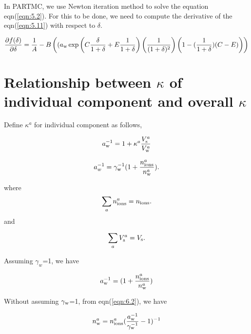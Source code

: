 \documentclass[12pt]{article}
\begin{document}
In PARTMC, we use Newton iteration method to solve the equation eqn(\ref{eqn:5.2}). For this to be done, we need to compute the derivative of the eqn(\ref{eqn:5.11}) with respect to $\delta$.

\begin{equation}\label{eqn:5.12}
\frac{\partial{f( \delta)} } {\partial{\delta}} =
\frac{1}{A} -B \left((a_{\rm w}\exp{\left(C \frac{\delta}{1+\delta} +E \frac{1}{1+\delta}\right)}   
\left(\frac{1}{(1+\delta)^{2}}\right)
\left(1-(\frac{1}{1+\delta})(C-E) \right)
\right)
\end{equation}

\section{Relationship between $\kappa$ of individual component and overall $\kappa$}

Define $\kappa^{a}$ for individual component as follows, 

\begin{equation}\label{eqn:6.1}
a_{\rm w}^{-1}=1+\kappa^{a} \frac{V_{\rm s}^{a}}{V_{\rm w}^{a}} 
\end{equation}

\begin{equation}\label{eqn:6.2}
a_{w}^{-1}=\gamma_{\rm w}^{-1} (1+\frac{n_{\rm ions}^{a}}{n_{\rm w}^{a}}).
\end{equation}

where
\begin{equation}\label{eqn:6.3}
\sum_{a} n_{\rm ions}^{a}=n_{\rm ions}.
\end{equation}
 and 
 
\begin{equation}\label{eqn:6.4}
\sum_{a} V_{\rm s}^{a}=V_{\rm s}.
\end{equation}

Assuming $\gamma_{w}$=1, we have 

\begin{equation}\label{eqn:6.5}
a_{\rm w}^{-1}=(1+\frac{n_{\rm ions}^{a}}{n_{\rm w}^{a}})
\end{equation}

Without assuming $\gamma_{\rm w}$=1, from eqn(\ref{eqn:6.2}), we have

\begin{equation}\label{eqn:6.6}
n_{\rm w}^{a}=n_{\rm ions}^{a}(\frac{a_{\rm w}^{-1}}{\gamma_{\rm w}^{-1}}-1)^{-1}
\end{equation}
\end{document}
